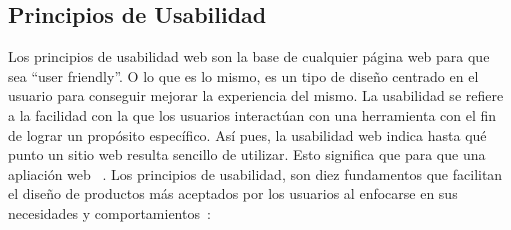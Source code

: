 \subsection{Principios de Usabilidad}
Los principios de usabilidad web son la base de cualquier página web para que sea “user friendly”. O lo que es lo mismo, es un tipo de diseño centrado en el usuario para conseguir mejorar la experiencia del mismo. La usabilidad se refiere a la facilidad con la que los usuarios interactúan con una herramienta con el fin de lograr un propósito específico. Así pues, la usabilidad web indica hasta qué punto un sitio web resulta sencillo de utilizar. Esto significa que para que una apliación web ~\cite{usabilidadJakob}. \newline
Los principios de usabilidad, son diez fundamentos que facilitan el diseño de productos más aceptados por los usuarios al enfocarse en sus necesidades y comportamientos~\cite{usabilidadJakob}:
